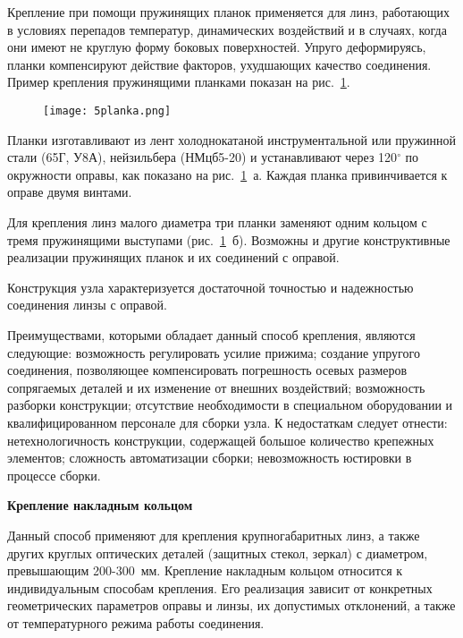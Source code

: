 Крепление при помощи пружинящих планок применяется для линз, работающих в условиях перепадов температур, динамических воздействий и в случаях, когда они имеют не круглую форму боковых поверхностей. Упруго деформируясь, планки компенсируют действие факторов, ухудшающих качество соединения. Пример крепления пружинящими планками показан на рис.~\ref{pic:5planka}.

\begin{figure}[h!]
	\texttt{[image: 5planka.png]}
	\label{pic:5planka}
\end{figure}

Планки изготавливают из лент холоднокатаной инструментальной или пружинной стали (65Г, У8А), нейзильбера (НМцб5-20) и устанавливают через 120$^\circ$ по окружности оправы, как показано на рис.~\ref{pic:5planka}~а. Каждая планка привинчивается к оправе двумя винтами.

Для крепления линз малого диаметра три планки заменяют одним кольцом с тремя пружинящими выступами (рис.~\ref{pic:5planka}~б). Возможны и другие конструктивные реализации пружинящих планок и их соединений с оправой.

Конструкция узла характеризуется достаточной точностью и надежностью соединения линзы с оправой.

Преимуществами, которыми обладает данный способ крепления, являются следующие: возможность регулировать усилие прижима; создание упругого соединения, позволяющее компенсировать погрешность осевых размеров сопрягаемых деталей и их изменение от внешних воздействий; возможность разборки конструкции; отсутствие необходимости в специальном оборудовании и квалифицированном персонале для сборки узла. К недостаткам следует отнести: нетехнологичность конструкции, содержащей большое количество крепежных элементов; сложность автоматизации сборки; невозможность юстировки в процессе сборки.

\begin{flushleft}
	\textbf{Крепление накладным кольцом}
\end{flushleft}

Данный способ применяют для крепления крупногабаритных линз, а также других круглых оптических деталей (защитных стекол, зеркал) с диаметром, превышающим 200-300~мм. Крепление накладным кольцом относится к индивидуальным способам крепления. Его реализация зависит от конкретных геометрических параметров оправы и линзы, их допустимых отклонений, а также от температурного режима работы соединения.

